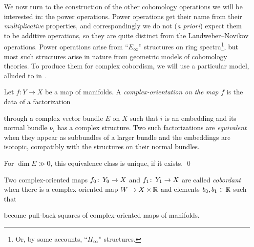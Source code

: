 We now turn to the construction of the other cohomology operations we will be interested in: the power operations.  Power operations get their name from their \emph{multiplicative} properties, and correspondingly we do not (\textit{a priori}) expect them to be additive operations, so they are quite distinct from the Landweber--Novikov operations.  Power operations arise from ``$E_\infty$'' structures on ring spectra\footnote{Or, by some accounts, ``$H_\infty$'' structures.}, but most such structures arise in nature from geometric models of cohomology theories.  To produce them for complex cobordism, we will use a particular model, alluded to in .


\begin{definition}
Let $f: Y \to X$ be a map of manifolds.  A \textit{complex-orientation on the map $f$} is the data of a factorization
\begin{center}
\end{center}
through a complex vector bundle $E$ on $X$ such that $i$ is an embedding and its normal bundle $\nu_i$ has a complex structure.  Two such factorizations are \textit{equivalent} when they appear as subbundles of a larger bundle and the embeddings are isotopic, compatibly with the structures on their normal bundles.
\end{definition}
\begin{lemma}
For $\dim E \gg 0$, this equivalence class is unique, if it exists. \qed
\end{lemma}
\begin{definition}
Two complex-oriented maps $f_0\colon\thinspace Y_0 \to X$ and $f_1\colon\thinspace Y_1 \to X$ are called \textit{cobordant} when there is a complex-oriented map $W \to X \times \mathbb R$ and elements $b_0, b_1 \in \mathbb R$ such that
\begin{center}
\end{center}
become pull-back squares of complex-oriented maps of manifolds.
\end{definition}

